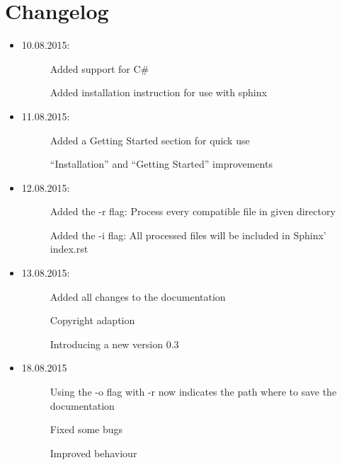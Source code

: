 \documentclass[letterpaper,10pt,english]{sphinxmanual}
\begin{document}
\chapter{Changelog}
\label{changelog::doc}\label{changelog:changelog}\begin{itemize}
\item {} \begin{description}
\item[{10.08.2015:}] \leavevmode
Added support for C\#

Added installation instruction for use with sphinx

\end{description}

\item {} \begin{description}
\item[{11.08.2015:}] \leavevmode
Added a Getting Started section for quick use

``Installation'' and ``Getting Started'' improvements

\end{description}

\item {} \begin{description}
\item[{12.08.2015:}] \leavevmode
Added the -r flag: Process every compatible file in given directory

Added the -i flag: All processed files will be included in Sphinx' index.rst

\end{description}

\item {} \begin{description}
\item[{13.08.2015:}] \leavevmode
Added all changes to the documentation

Copyright adaption

Introducing a new version 0.3

\end{description}

\item {} \begin{description}
\item[{18.08.2015}] \leavevmode
Using the -o flag with -r now indicates the path where to save the documentation

Fixed some bugs

Improved behaviour


\end{description}
\end{itemize}
\end{document}
